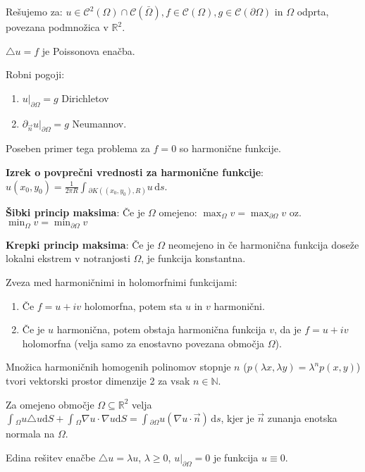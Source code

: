 \documentclass[10pt,a4paper]{amsart}
\theoremstyle{definition} %
\theoremstyle{plain} %
\newcommand{\ds}{\ensuremath{\,\mathrm{d}s}}
\let\oldint\int
\renewcommand{\int}{\oldint \!}
\newcommand{\R}{\mathbb R}
\newcommand{\N}{\mathbb N}
\newcommand{\Cont}{\mathcal{C}}
\begin{document}
Rešujemo za: $u \in \Cont^2 ( \Omega) \cap \Cont (\bar{\Omega}), f \in \Cont ( \Omega ), g \in \Cont ( \partial \Omega )$ in $\Omega$ odprta, povezana podmnožica v $\R^2$.

$\triangle u = f$ je Poissonova enačba.

Robni pogoji:
\begin{enumerate}

\item $u|_{\partial \Omega} = g$ Dirichletov

\item $\partial_{\vec{n}} u |_{\partial \Omega} = g$ Neumannov.

\end{enumerate}

Poseben primer tega problema za $f=0$ so harmonične funkcije.

\textbf{Izrek o povprečni vrednosti za harmonične funkcije}: $u(x_0,y_0) = \frac{1}{2\pi R} \int_{\partial K((x_0,y_0),R)}u \ds$.

\textbf{Šibki princip maksima}: Če je $\Omega$ omejeno: $\max_{\Omega} v = \max_{\partial \Omega} v$ oz.  $\min_{\Omega} v = \min_{\partial \Omega} v$

\textbf{Krepki princip maksima}: Če je $\Omega$ neomejeno in če harmonična funkcija doseže lokalni ekstrem v notranjosti $\Omega$, je funkcija konstantna.

Zveza med harmoničnimi in holomorfnimi funkcijami:
\begin{enumerate}

\item Če $f = u + iv$ holomorfna, potem sta $u$ in $v$ harmonični.

\item Če je $u$ harmonična, potem obstaja harmonična funkcija $v$, da je $f = u + iv$ holomorfna (velja samo za enostavno povezana območja $\Omega$).

\end{enumerate}

Množica harmoničnih homogenih polinomov stopnje $n$ ($p(\lambda x,\lambda y) = \lambda^n p(x,y)$) tvori vektorski prostor dimenzije 2 za vsak $n \in \N$.

Za omejeno območje $\Omega \subseteq \R^2$ velja $\int_\Omega u \triangle u \mathrm{d}S + \int_\Omega \nabla u \cdot \nabla u \mathrm{d}S = \int_{\partial \Omega} u(\nabla u \cdot \vec{n})\ds$, kjer je $\vec{n}$ zunanja enotska normala na $\Omega$.

Edina rešitev enačbe $\triangle u = \lambda u$, $\lambda \geq 0$, $u|_{\partial \Omega} = 0$ je funkcija $u \equiv 0$.
\end{document}
